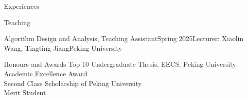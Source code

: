 \documentclass{resume} %
\begin{document}
\begin{rSection}{Experiences}{}
\end{rSection}

\begin{rSection}{Teaching}{}
    \begin{teachSubsection}{Algorithm Design and Analysis, Teaching Assistant}{Spring 2025}{Lecturer: Xiaolin Wang, Tingting Jiang}{Peking University}
    \end{teachSubsection}
\end{rSection}

\begin{rSection}{Honours and Awards}{}
    Top 10 Undergraduate Thesis, EECS, Peking University 
    \\ Academic Excellence Award 
    \\ Second Class Scholarship of Peking University 
    \\ Merit Student 
\end{rSection}
\end{document}
